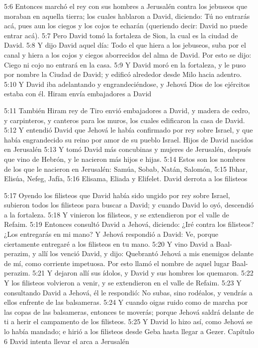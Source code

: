 5:6 Entonces marchó el rey con sus hombres a Jerusalén contra los jebuseos que moraban en aquella tierra; los cuales hablaron a David, diciendo: Tú no entrarás acá, pues aun los ciegos y los cojos te echarán (queriendo decir: David no puede entrar acá).  
5:7 Pero David tomó la fortaleza de Sion, la cual es la ciudad de David.  
5:8 Y dijo David aquel día: Todo el que hiera a los jebuseos, suba por el canal y hiera a los cojos y ciegos aborrecidos del alma de David. Por esto se dijo: Ciego ni cojo no entrará en la casa.  
5:9 Y David moró en la fortaleza, y le puso por nombre la Ciudad de David; y edificó alrededor desde Milo hacia adentro.  
5:10 Y David iba adelantando y engrandeciéndose, y Jehová Dios de los ejércitos estaba con él.  
Hiram envía embajadores a David  
 
5:11 También Hiram rey de Tiro envió embajadores a David, y madera de cedro, y carpinteros, y canteros para los muros, los cuales edificaron la casa de David.  
5:12 Y entendió David que Jehová le había confirmado por rey sobre Israel, y que había engrandecido su reino por amor de su pueblo Israel.  
Hijos de David nacidos en Jerusalén   
5:13 Y tomó David más concubinas y mujeres de Jerusalén, después que vino de Hebrón, y le nacieron más hijos e hijas.  
5:14 Estos son los nombres de los que le nacieron en Jerusalén: Samúa, Sobab, Natán, Salomón,  
5:15 Ibhar, Elisúa, Nefeg, Jafía,  
5:16 Elisama, Eliada y Elifelet.  
David derrota a los filisteos  
 
5:17 Oyendo los filisteos que David había sido ungido por rey sobre Israel, subieron todos los filisteos para buscar a David; y cuando David lo oyó, descendió a la fortaleza.  
5:18 Y vinieron los filisteos, y se extendieron por el valle de Refaim.  
5:19 Entonces consultó David a Jehová, diciendo: ¿Iré contra los filisteos? ¿Los entregarás en mi mano? Y Jehová respondió a David: Ve, porque ciertamente entregaré a los filisteos en tu mano.  
5:20 Y vino David a Baal-perazim, y allí los venció David, y dijo: Quebrantó Jehová a mis enemigos delante de mí, como corriente impetuosa. Por esto llamó el nombre de aquel lugar Baal-perazim.  
5:21 Y dejaron allí sus ídolos, y David y sus hombres los quemaron.  
5:22 Y los filisteos volvieron a venir, y se extendieron en el valle de Refaim.  
5:23 Y consultando David a Jehová, él le respondió: No subas, sino rodéalos, y vendrás a ellos enfrente de las balsameras.  
5:24 Y cuando oigas ruido como de marcha por las copas de las balsameras, entonces te moverás; porque Jehová saldrá delante de ti a herir el campamento de los filisteos.  
5:25 Y David lo hizo así, como Jehová se lo había mandado; e hirió a los filisteos desde Geba hasta llegar a Gezer.  
Capítulo 6
David intenta llevar el arca a Jerusalén  
 

